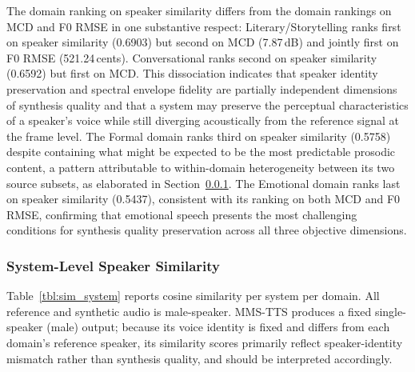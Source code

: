 \documentclass[a4paper,fleqn]{cas-dc}
\begin{document}
    \hspace*{1.2em} The domain ranking on speaker similarity differs from the domain rankings
    on MCD and F0 RMSE in one substantive respect: Literary/Storytelling ranks
    first on speaker similarity (0.6903) but second on MCD (7.87\,dB) and
    jointly first on F0 RMSE (521.24\,cents). Conversational ranks second on
    speaker similarity (0.6592) but first on MCD. This dissociation indicates
    that speaker identity preservation and spectral envelope fidelity are
    partially independent dimensions of synthesis quality and that a system
    may preserve the perceptual characteristics of a speaker's voice while
    still diverging acoustically from the reference signal at the frame level.
    The Formal domain ranks third on speaker similarity (0.5758) despite
    containing what might be expected to be the most predictable prosodic
    content, a pattern attributable to within-domain heterogeneity between
    its two source subsets, as elaborated in
    Section~\ref{sec:results-speaker-system}. The Emotional domain ranks
    last on speaker similarity (0.5437), consistent with its ranking on both
    MCD and F0 RMSE, confirming that emotional speech presents the most
    challenging conditions for synthesis quality preservation across all
    three objective dimensions.
    
    \subsubsection{System-Level Speaker Similarity}\label{sec:results-speaker-system}
    
    \hspace*{1.2em} Table~\ref{tbl:sim_system} reports cosine similarity per system per domain. All reference and synthetic audio is male-speaker. MMS-TTS produces a fixed single-speaker (male) output; because its voice identity is fixed and differs from each domain's reference speaker, its similarity scores primarily reflect speaker-identity mismatch rather than synthesis quality, and should be interpreted accordingly.
    
\end{document}
